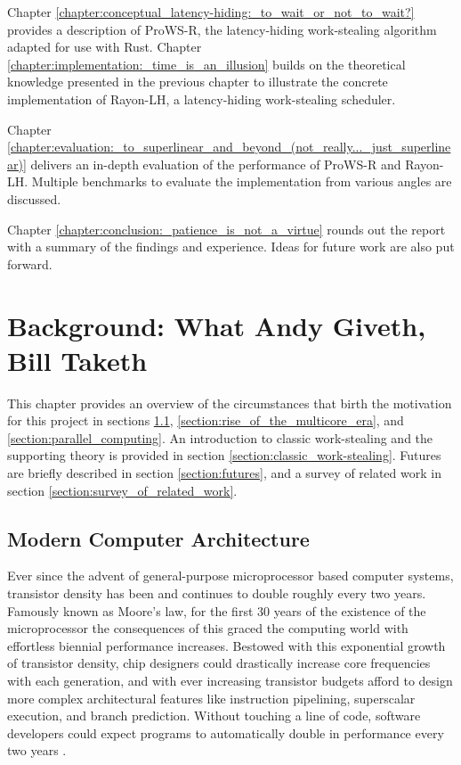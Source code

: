 \documentclass[bsc,frontabs,singlespacing,parskip,deptreport,normalheadings]{infthesis}
\begin{document}
Chapter \ref{chapter:conceptual_latency-hiding:_to_wait_or_not_to_wait?}
provides a description of ProWS-R, the latency-hiding work-stealing algorithm
adapted for use with Rust. Chapter
\ref{chapter:implementation:_time_is_an_illusion} builds on the theoretical
knowledge presented in the previous chapter to illustrate the concrete
implementation of Rayon-LH, a latency-hiding work-stealing scheduler.

Chapter
\ref{chapter:evaluation:_to_superlinear_and_beyond_(not_really..._just_superlinear)}
delivers an in-depth evaluation of the performance of ProWS-R and Rayon-LH.
Multiple benchmarks to evaluate the implementation from various angles are
discussed.

Chapter \ref{chapter:conclusion:_patience_is_not_a_virtue} rounds out the report
with a summary of the findings and experience. Ideas for future work are also
put forward.


\chapter{Background: What Andy Giveth, Bill Taketh}
\label{chapter:background:_what_andy_giveth,_bill_taketh}

This chapter provides an overview of the circumstances that birth the motivation
for this project in sections \ref{section:modern_computer_architecture},
\ref{section:rise_of_the_multicore_era}, and \ref{section:parallel_computing}.
An introduction to classic work-stealing and the supporting theory is provided
in section \ref{section:classic_work-stealing}. Futures are briefly described in
section \ref{section:futures}, and a survey of related work in section
\ref{section:survey_of_related_work}.

\section{Modern Computer Architecture}
\label{section:modern_computer_architecture}

Ever since the advent of general-purpose microprocessor based computer systems,
transistor density has been and continues to double roughly every two years.
Famously known as Moore's law, for the first 30 years of the existence of the
microprocessor the consequences of this graced the computing world with
effortless biennial performance increases. Bestowed with this exponential growth
of transistor density, chip designers could drastically increase core
frequencies with each generation, and with ever increasing transistor budgets
afford to design more complex architectural features like instruction
pipelining, superscalar execution, and branch prediction. Without touching a
line of code, software developers could expect programs to automatically double
in performance every two years \cite{hennessy_new_2019}.
\end{document}
